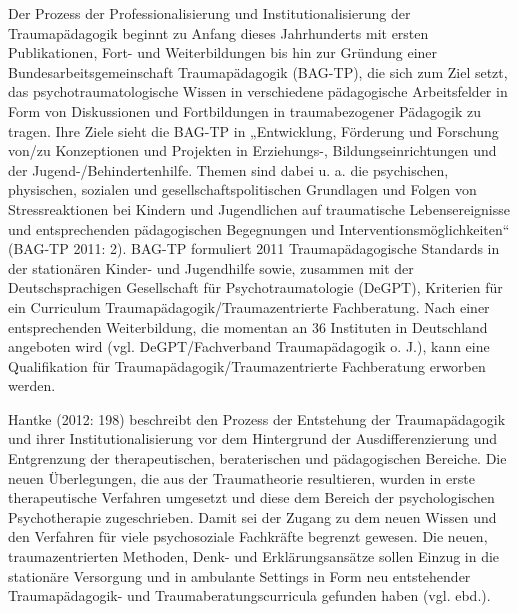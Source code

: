 Der Prozess der Professionalisierung und Institutionalisierung der Traumapädagogik beginnt zu Anfang dieses Jahrhunderts mit ersten Publikationen, Fort- und Weiterbildungen bis hin zur Gründung einer Bundesarbeitsgemeinschaft Traumapädagogik (BAG-TP), die sich zum Ziel setzt, das psychotraumatologische Wissen in verschiedene pädagogische Arbeitsfelder in Form von Diskussionen und Fortbildungen in traumabezogener Pädagogik zu tragen. Ihre Ziele sieht die BAG-TP in „Entwicklung, Förderung und Forschung von/zu Konzeptionen und Projekten in Erziehungs-, Bildungseinrichtungen und der Jugend-/Behindertenhilfe. Themen sind dabei u. a. die psychischen, physischen, sozialen und gesellschaftspolitischen Grundlagen und Folgen von Stressreaktionen bei Kindern und Jugendlichen auf traumatische Lebensereignisse und entsprechenden pädagogischen Begegnungen und Interventionsmöglichkeiten“ (BAG-TP 2011: 2). BAG-TP formuliert 2011 Traumapädagogische Standards in der stationären Kinder- und Jugendhilfe sowie, zusammen mit der Deutschsprachigen Gesellschaft für Psychotraumatologie (DeGPT), Kriterien für ein Curriculum Traumapädagogik/Traumazentrierte Fachberatung. Nach einer entsprechenden Weiterbildung, die momentan an 36 Instituten in Deutschland angeboten wird (vgl. DeGPT/Fachverband Traumapädagogik o. J.), kann eine Qualifikation für Traumapädagogik/Traumazentrierte Fachberatung erworben werden.

Hantke (2012: 198) beschreibt den Prozess der Entstehung der Traumapädagogik und ihrer Institutionalisierung vor dem Hintergrund der Ausdifferenzierung und Entgrenzung der therapeutischen, beraterischen und pädagogischen Bereiche. Die neuen Überlegungen, die aus der Traumatheorie resultieren, wurden in erste therapeutische Verfahren umgesetzt und diese dem Bereich der psychologischen Psychotherapie zugeschrieben. Damit sei der Zugang zu dem neuen Wissen und den Verfahren für viele psychosoziale Fachkräfte begrenzt gewesen. Die neuen, traumazentrierten Methoden, Denk- und Erklärungsansätze sollen Einzug in die stationäre Versorgung und in ambulante Settings in Form neu entstehender Traumapädagogik- und Traumaberatungscurricula gefunden haben (vgl. ebd.).
